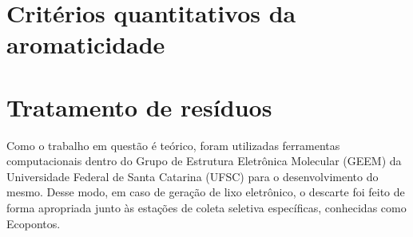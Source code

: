 \section{Critérios quantitativos da aromaticidade}


\section{Tratamento de resíduos}

Como o trabalho em questão é teórico, foram utilizadas ferramentas computacionais dentro do Grupo de Estrutura Eletrônica Molecular (GEEM) da Universidade Federal de Santa Catarina (UFSC) para o desenvolvimento do mesmo. Desse modo, em caso de geração de lixo eletrônico, o descarte foi feito de forma apropriada junto às estações de coleta seletiva específicas, conhecidas como Ecopontos.